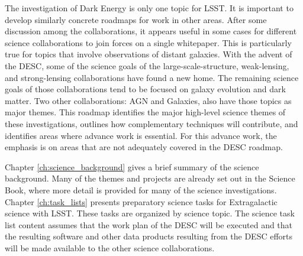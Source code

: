 The investigation of Dark Energy is only one topic for LSST. It is important to
develop similarly concrete roadmaps for work in other areas.  After some
discussion among the collaborations, it appears useful in some cases for
different science collaborations to join forces on a single whitepaper. This is
particularly true for topics that involve observations of distant galaxies. With
the advent of the DESC, some of the science goals of the large-scale-structure,
weak-lensing, and strong-lensing collaborations have found a new home. The
remaining science goals of those collaborations tend to be focused on galaxy
evolution and dark matter. Two other collaborations: AGN and Galaxies, also have
those topics as major themes. This roadmap identifies the major high-level
science themes of these investigations, outlines how complementary techniques
will contribute, and identifies areas where advance work is essential. For this
advance work, the emphasis is on areas that are not adequately covered in the
DESC roadmap. 

Chapter \ref{ch:science_background} gives a brief summary of the science background.
Many of the themes and projects are already set out in the Science Book, where more
detail is provided for many of the science investigations. 
Chapter \ref{ch:task_lists} presents preparatory science tasks for 
Extragalactic science with LSST. These tasks are organized by science topic.
The science task list content assumes that the work plan of the DESC will be executed
and that the resulting software and other data products resulting from the DESC
efforts will be made available to the other science collaborations.


